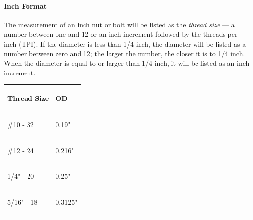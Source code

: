 \documentclass[12pt, a4paper]{article}
\let\oldparagraph\paragraph
\renewcommand{\paragraph}[1]{\oldparagraph{#1}\mbox{}}
\begin{document}
		\hypertarget{iof4zr}{%
			\paragraph{Inch Format}\label{iof4zr}}
		
		\hypertarget{ihinup}{}
		The measurement of an inch nut or bolt will be listed as the
		\emph{thread size} --- a number between one and 12 or an inch increment
		followed by the threads per inch (TPI). If the diameter is less than 1/4
		inch, the diameter will be listed as a number between zero and 12; the
		larger the number, the closer it is to 1/4 inch. When the diameter is
		equal to or larger than 1/4 inch, it will be listed as an inch
		increment.
		
		\begin{longtable}[]{@{}ll@{}}
			\toprule
			\begin{minipage}[b]{0.47\columnwidth}\raggedright
				\hypertarget{ip8vlo}{}
				Thread Size\strut
			\end{minipage} & \begin{minipage}[b]{0.47\columnwidth}\raggedright
				\hypertarget{ilg6c1}{}
				OD\strut
			\end{minipage}\tabularnewline
			\midrule
			\endhead
			\begin{minipage}[t]{0.47\columnwidth}\raggedright
				\hypertarget{ij13wo}{}
				\#10 - 32\strut
			\end{minipage} & \begin{minipage}[t]{0.47\columnwidth}\raggedright
				\hypertarget{imhx99}{}
				0.19"\strut
			\end{minipage}\tabularnewline
			\begin{minipage}[t]{0.47\columnwidth}\raggedright
				\hypertarget{iofufv}{}
				\#12 - 24\strut
			\end{minipage} & \begin{minipage}[t]{0.47\columnwidth}\raggedright
				\hypertarget{i5dvs2}{}
				0.216"\strut
			\end{minipage}\tabularnewline
			\begin{minipage}[t]{0.47\columnwidth}\raggedright
				\hypertarget{iwitbx}{}
				1/4" - 20\strut
			\end{minipage} & \begin{minipage}[t]{0.47\columnwidth}\raggedright
				\hypertarget{i2rpr7}{}
				0.25"\strut
			\end{minipage}\tabularnewline
			\begin{minipage}[t]{0.47\columnwidth}\raggedright
				\hypertarget{icppsh}{}
				5/16" - 18\strut
			\end{minipage} & \begin{minipage}[t]{0.47\columnwidth}\raggedright
				\hypertarget{ie9zwk}{}
				0.3125"\strut
			\end{minipage}\tabularnewline
			\bottomrule
		\end{longtable}
		
\end{document}
